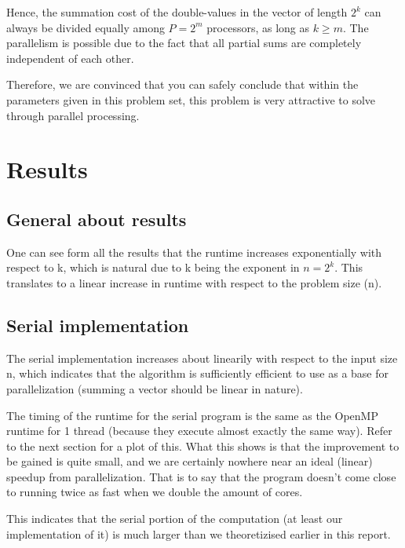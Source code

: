 \documentclass[fontsize=11pt,paper=a4,titlepage]{report}
\begin{document}
Hence, the summation cost of the double-values in the vector of length $2^k$ can
always be divided equally among $P = 2^m$ processors, as long as $k\geq m$. The
parallelism is possible due to the fact that all partial sums are completely
independent of each other.

Therefore, we are convinced that you can safely conclude that within the
parameters given in this problem set, this problem is very attractive to solve
through parallel processing.

\section{Results}

\subsection{General about results}
One can see form all the results that the runtime increases exponentially with respect to k, which is natural due to k being the exponent in $n=2^k$. This translates to a linear increase in runtime with respect to the problem size (n).


\subsection{Serial implementation}

The serial implementation increases about linearily with respect to the input size n, which indicates that 
the algorithm is sufficiently efficient to use as a base for parallelization (summing a vector should be linear in nature).

The timing of the runtime for the serial program is the same as the OpenMP runtime for 1 thread (because they execute almost exactly the same way). Refer to the next section for a plot of this. What this shows is that the improvement to be gained is quite small, and we are certainly nowhere near an ideal (linear) speedup from parallelization. That is to say that the program doesn't come close to running twice as fast when we double the amount of cores.

This indicates that the serial portion of the computation (at least our implementation of it) is much larger than we theoretizised earlier in this report.

\clearpage
\end{document}
